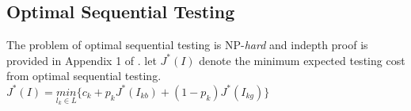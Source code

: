 \documentclass[10pt]{sigplan-proc-varsize}
\begin{document}
\subsection{Optimal Sequential Testing}
The problem of optimal sequential testing is NP-{\it hard} and indepth proof is provided in Appendix 1 of \cite{krishna:12}. let $J^*(I)$ denote the minimum expected testing cost from optimal sequential testing. \\
$J^*(I) = \underset{l_k \in L}{min}\{c_k+p_kJ^*(I_{kb})+(1-p_k)J^*(I_{kg})\}$

\appendix
%
%


\end{document}
